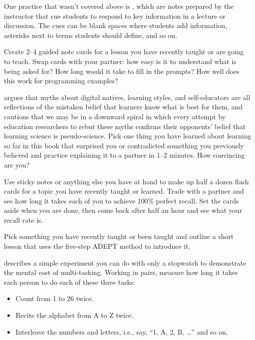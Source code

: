 
One practice that wasn't covered above is ,
which are notes prepared by the instructor
that cue students to respond to key information in a lecture or discussion.
The cues can be blank spaces where students add information,
asterisks next to terms students should define,
and so on.

Create 2--4 guided note cards for a lesson you have recently taught
or are going to teach.
Swap cards with your partner:
how easy is it to understand what is being asked for?
How long would it take to fill in the prompts?
How well does this work for programming examples?


\cite{Kirs2013} argues that myths about digital natives,
learning styles,
and self-educators are all reflections of the mistaken belief that
learners know what is best for them,
and cautions that we may be in a downward spiral
in which every attempt by education researchers to rebut these myths
confirms their opponents' belief that learning science is pseudo-science.
Pick one thing you have learned about learning so far in this book
that surprised you or contradicted something you previously believed
and practice explaining it to a partner in 1--2 minutes.
How convincing are you?


Use sticky notes or anything else you have at hand
to make up half a dozen flash cards
for a topic you have recently taught or learned.
Trade with a partner and see how long it takes each of you
to achieve 100\% perfect recall.
Set the cards aside when you are done,
then come back after half an hour and see what your recall rate is.


Pick something you have recently taught or been taught
and outline a short lesson that uses the five-step ADEPT method to introduce it.


describes a simple experiment you can do with only a stopwatch
to demonstrate the mental cost of multi-tasking.
Working in pairs,
measure how long it takes each person to do each of these three tasks:

\begin{itemize}
\item
  Count from 1 to 26 twice.
\item
  Recite the alphabet from A to Z twice.
\item
  Interleave the numbers and letters,
  i.e., say, ``1, A, 2, B, {\ldots}''
  and so on.
\end{itemize}

